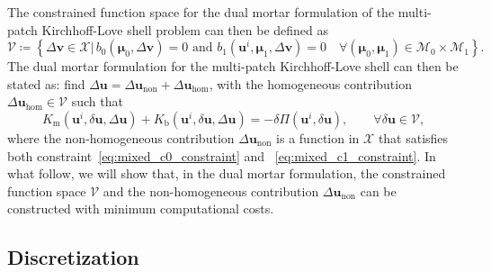 The constrained function space for the dual mortar formulation of the multi-patch Kirchhoff-Love shell problem can then be defined as
\begin{equation}
	\boldsymbol{\mathcal{V}}\coloneq\left\{ \Delta\mathbf{v}\in \boldsymbol{\mathcal{X}} \vert\,b_0(\boldsymbol{\mu}_0,\Delta\mathbf{v})=0 \text{ and }b_1(\mathbf{u}^i,\boldsymbol{\mu}_1,\Delta\mathbf{v})=0\quad\forall(\boldsymbol{\mu}_0,\boldsymbol{\mu}_1)\in{\mathcal{M}_0\times{}\mathcal{M}_1}\right\}.
\end{equation}
The dual mortar formulation for the multi-patch Kirchhoff-Love shell can then be stated as: find $\Delta\mathbf{u}=\Delta\mathbf{u}_\text{non}+\Delta\mathbf{u}_\text{hom}$, with the homogeneous contribution $\Delta\mathbf{u}_\text{hom}\in \boldsymbol{\mathcal{V}}$ such that
\begin{equation}
	K_\text{m}(\mathbf{u}^i,\delta\mathbf{u},\Delta\mathbf{u})+K_\text{b}(\mathbf{u}^i,\delta\mathbf{u},\Delta\mathbf{u})=-\delta \Pi(\mathbf{u}^{i},\delta\mathbf{u}),\qquad \forall \delta\mathbf{u}\in \boldsymbol{\mathcal{V}},\label{eq:kl_shell_dual_mortar}
\end{equation}
where the non-homogeneous contribution $\Delta\mathbf{u}_\text{non}$ is a function in $\boldsymbol{\mathcal{X}}$ that satisfies both constraint~\eqref{eq:mixed_c0_constraint} and ~\eqref{eq:mixed_c1_constraint}. In what follow, we will show that, in the dual mortar formulation, the constrained function space $\boldsymbol{\mathcal{V}}$ and the non-homogeneous contribution $\Delta\mathbf{u}_\text{non}$ can be constructed with minimum computational costs.

\subsection{Discretization}

